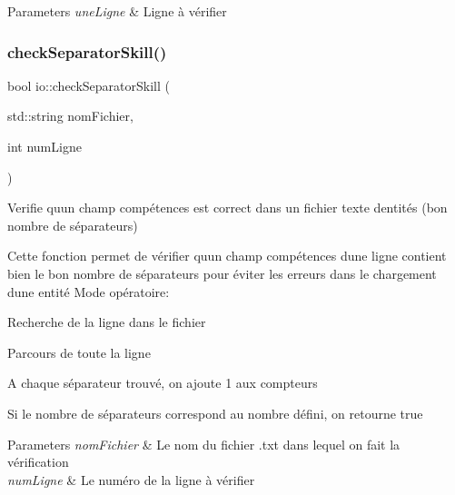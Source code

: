 \begin{DoxyParams}{Parameters}
{\em une\+Ligne} & Ligne à vérifier \\
\hline
\end{DoxyParams}
\mbox{\label{namespaceio_ae543bba7ec112a88734317ca61bbb88a}} 
\subsubsection{\texorpdfstring{check\+Separator\+Skill()}{checkSeparatorSkill()}}
{\footnotesize\ttfamily bool io\+::check\+Separator\+Skill (\begin{DoxyParamCaption}\item[{std\+::string}]{nom\+Fichier,  }\item[{int}]{num\+Ligne }\end{DoxyParamCaption})}



Verifie qu\textquotesingle{}un champ compétences est correct dans un fichier texte d\textquotesingle{}entités (bon nombre de séparateurs) 

Cette fonction permet de vérifier qu\textquotesingle{}un champ compétences d\textquotesingle{}une ligne contient bien le bon nombre de séparateurs pour éviter les erreurs dans le chargement d\textquotesingle{}une entité Mode opératoire\+:
\begin{DoxyItemize}
\item Recherche de la ligne dans le fichier
\item Parcours de toute la ligne
\item A chaque séparateur trouvé, on ajoute 1 aux compteurs
\item Si le nombre de séparateurs correspond au nombre défini, on retourne true
\end{DoxyItemize}


\begin{DoxyParams}{Parameters}
{\em nom\+Fichier} & Le nom du fichier .txt dans lequel on fait la vérification \\
\hline
{\em num\+Ligne} & Le numéro de la ligne à vérifier \\
\hline
\end{DoxyParams}
\mbox{\label{namespaceio_a5a0d785914a680440e4986a02b50a28e}} 
